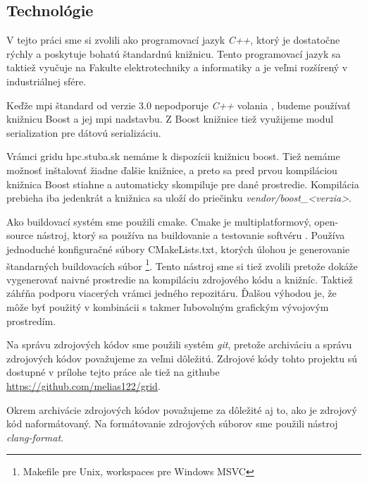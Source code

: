 \subsection{Technológie}
V tejto práci sme si zvolili ako programovací jazyk \textit{C++}, ktorý je dostatočne rýchly a poskytuje bohatú štandardnú knižnicu.
Tento programovací jazyk sa taktiež vyučuje na Fakulte elektrotechniky a informatiky a je veľmi rozšírený v industriálnej sfére.

Keďže \acrshort{mpi} štandard od verzie 3.0 nepodporuje \textit{C++} volania \cite{mpi3-1},
budeme používať knižnicu Boost a jej \acrshort{mpi} nadstavbu. Z Boost knižnice tiež využijeme modul serialization pre dátovú serializáciu.

Vrámci gridu hpc.stuba.sk nemáme k dispozícii knižnicu boost. Tiež nemáme možnosť inštalovať žiadne ďalšie knižnice,
a preto sa pred prvou kompiláciou knižnica Boost stiahne a automaticky skompiluje pre dané prostredie.
Kompilácia prebieha iba jedenkrát a knižnica sa uloží do priečinku \textit{vendor/boost\_<verzia>}.

Ako buildovací systém sme použili cmake.
Cmake je multiplatformový, open-source nástroj, ktorý sa používa na buildovanie a testovanie softvéru \cite{cmake-doc}.
Používa jednoduché konfiguračné súbory CMakeLists.txt, ktorých úlohou je generovanie štandarných buildovacích súbor \footnote{Makefile pre Unix, workspaces pre Windows MSVC}. Tento nástroj sme si tiež zvolili pretože dokáže vygenerovať naivné prostredie na kompiláciu zdrojového kódu a knižníc.
Taktiež záhŕňa podporu viacerých  vrámci jedného repozitáru.
Ďalšou výhodou je, že môže byť použitý v kombinácii s takmer ľubovolným grafickým vývojovým prostredím.

Na správu zdrojových kódov sme použili systém \textit{git}, pretože archiváciu a správu zdrojových kódov považujeme za veľmi dôležitú.
Zdrojové kódy tohto projektu sú dostupné v prílohe tejto práce ale tiež na githube \url{https://github.com/melias122/grid}.

Okrem archivácie zdrojových kódov považujeme za dôležité aj to, ako je zdrojový kód naformátovaný.
Na formátovanie zdrojových súborov sme použili nástroj \textit{clang-format}.

